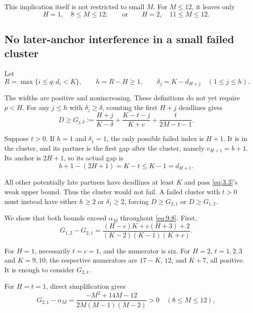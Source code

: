 \documentclass[11pt,a4paper]{article}
\begin{document}
This implication itself is not restricted to small \(M\). For \(M\le 12\), it leaves only
\begin{equation}
H=1,\quad 8\le M\le12;
 \qquad\text{or}\qquad
 H=2,\quad 11\le M\le12.
\tag{9.8}
\label{eq:9.8}
\end{equation}

\hypertarget{no-later-anchor-interference-in-a-small-failed-cluster}{%
\subsection{No later-anchor interference in a small failed cluster}\label{no-later-anchor-interference-in-a-small-failed-cluster}}

Let
\[
 R=\max\{i\le q:d_i<K\},\qquad h=R-H\ge1,
 \qquad \delta_j=K-d_{H+j}\quad(1\le j\le h).
\]

The widths are positive and nonincreasing. These definitions do not yet require \(p<H\). For any \(j\le h\) with \(\delta_j\ge \delta\), counting the first \(H+j\) deadlines gives
\begin{equation}
D\ge G_{j,\delta}:=
 \frac{H+j}{K-\delta}+\frac{K-t-j}{K+c}
 +\frac t{2M-t-1}.
\tag{9.9}
\label{eq:9.9}
\end{equation}

Suppose \(t>0\). If \(h=1\) and \(\delta_1=1\), the only possible failed index is \(H+1\). It is in the cluster, and its partner is the first gap after the cluster, namely \(v_{H+1}=b+1\). Its anchor is \(2H+1\), so its actual gap is
\[
 b+1-(2H+1)=K-t\le K-1=d_{H+1}.
\]

All other potentially late partners have deadlines at least \(K\) and pass \eqref{eq:3.3}'s weak upper bound. Thus the cluster would not fail. A failed cluster with \(t>0\) must instead have either \(h\ge 2\) or \(\delta_1\ge 2\), forcing \(D\ge G_{2,1}\) or \(D\ge G_{1,2}\).

We show that both bounds exceed \(\alpha_M\) throughout \eqref{eq:9.8}. First,
\begin{equation}
G_{1,2}-G_{2,1}
 =\frac{(H-c)K+c(H+3)+2}{(K-2)(K-1)(K+c)}.
\tag{9.10}
\label{eq:9.10}
\end{equation}

For \(H=1\), necessarily \(t=c=1\), and the numerator is six. For \(H=2\), \(t=1,2,3\) and \(K=9,10\); the respective numerators are \(17-K\), \(12\), and \(K+7\), all positive. It is enough to consider \(G_{2,1}\).

For \(H=t=1\), direct simplification gives
\begin{equation}
G_{2,1}-\alpha_M
 =\frac{-M^2+14M-12}{2M(M-1)(M-2)}>0
 \quad(8\le M\le12),
\tag{9.11}
\label{eq:9.11}
\end{equation}
\end{document}
